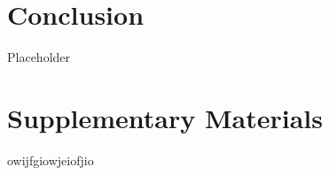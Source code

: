     \section{Conclusion}
    \label{sec:conclusion}

        Placeholder

    \section{Supplementary Materials}
    \label{sec:supplementary-materials}

        owijfgiowjeiofjio


    \pagebreak

    
    


